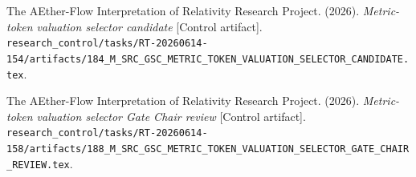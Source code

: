\documentclass[11pt]{article}
\begin{document}
The AEther-Flow Interpretation of Relativity Research Project. (2026).
\textit{Metric-token valuation selector candidate} [Control artifact].
\texttt{research_control/tasks/RT-20260614-154/artifacts/184\_M\_SRC\_GSC\_METRIC\_TOKEN\_VALUATION\_SELECTOR\_CANDIDATE.tex}.

The AEther-Flow Interpretation of Relativity Research Project. (2026).
\textit{Metric-token valuation selector Gate Chair review} [Control artifact].
\texttt{research_control/tasks/RT-20260614-158/artifacts/188\_M\_SRC\_GSC\_METRIC\_TOKEN\_VALUATION\_SELECTOR\_GATE\_CHAIR\_REVIEW.tex}.
\end{document}
